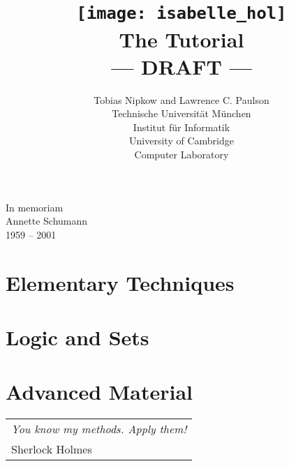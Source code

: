 \documentclass{article}
\begin{document}
\title{\texttt{[image: isabelle\_hol]}
       \\ \vspace{0.5cm} The Tutorial
       \\ --- DRAFT ---}
\author{Tobias Nipkow and Lawrence C. Paulson\\[1ex]
Technische Universit{\"a}t M{\"u}nchen \\
Institut f{\"u}r Informatik \\[1ex]
University of Cambridge\\
Computer Laboratory}
\maketitle

\setcounter{page}{5}
\vspace*{\fill}
\begin{center}
\LARGE In memoriam \\[1ex]
{\sc Annette Schumann}\\[1ex]
1959 -- 2001
\end{center}
\vspace*{\fill}
\vspace*{\fill}
\newpage


\tableofcontents

\cleardoublepage{}

\part{Elementary Techniques}




\part{Logic and Sets}



\part{Advanced Material}




\markboth{}{}
\cleardoublepage
\vspace*{\fill}
\begin{flushright}
\begin{tabular}{l}
{\large\sf\slshape You know my methods. Apply them!}\\[1ex]
Sherlock Holmes
\end{tabular}
\end{flushright}
\vspace*{\fill}
\vspace*{\fill}





\printindex
\end{document}
